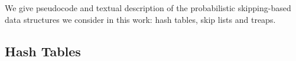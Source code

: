 We give pseudocode and textual description of the probabilistic skipping-based data structures we consider in this work: hash tables, skip lists and treaps.

\subsection{Hash Tables}
\label{prelim:ht}

\begin{figure*}[h]
            \centering
            \begin{pchstack}[boxed,center,space=0.5em]
                \begin{pcvstack}[space=1ex]
                        

\end{pcvstack}
\end{pchstack}
\end{figure*}
